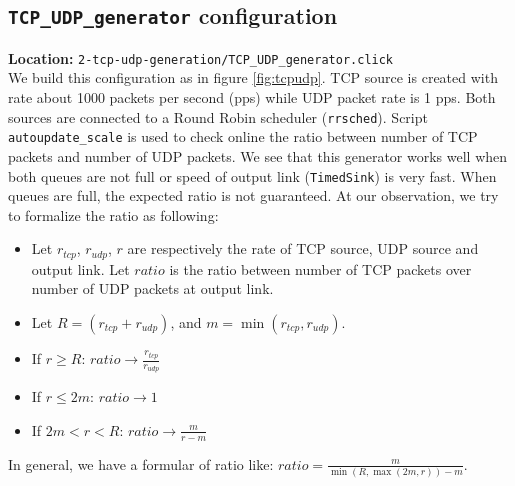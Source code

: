 \documentclass[a4paper]{article}
\begin{document}
  \subsection{\texttt{TCP\_UDP\_generator} configuration}
  \textbf{Location:} \texttt{2-tcp-udp-generation/TCP\_UDP\_generator.click} \\
  We build this configuration as in figure \ref{fig:tcpudp}. TCP source is created with rate about 1000 packets per second (pps) while UDP packet rate is 1 pps. Both sources are connected to a Round Robin scheduler (\texttt{rrsched}). Script \texttt{autoupdate\_scale} is used to check online the ratio between number of TCP packets and number of UDP packets. We see that this generator works well when both queues are not full or speed of output link (\texttt{TimedSink}) is very fast. When queues are full, the expected ratio is not guaranteed. At our observation, we try to formalize the ratio as following:
  \begin{itemize}
  	\item Let $r_{tcp}$, $r_{udp}$, $r$ are respectively the rate of TCP source, UDP source and output link. Let $ratio$ is the ratio between number of TCP packets over number of UDP packets at output link.
  	\item Let $R = (r_{tcp} + r_{udp})$, and $m = \min(r_{tcp}, r_{udp})$.
  	\item If $r \ge R$: $ratio \to \frac{r_{tcp}}{r_{udp}}$
  	\item If $r \le 2m$: $ratio \to 1$
  	\item If $ 2m < r < R$: $ratio \to \frac{m}{r - m}$
  \end{itemize}
  In general, we have a formular of ratio like: $ratio = \frac{m}{\min(R, \max(2m, r)) - m}$.
\end{document}
